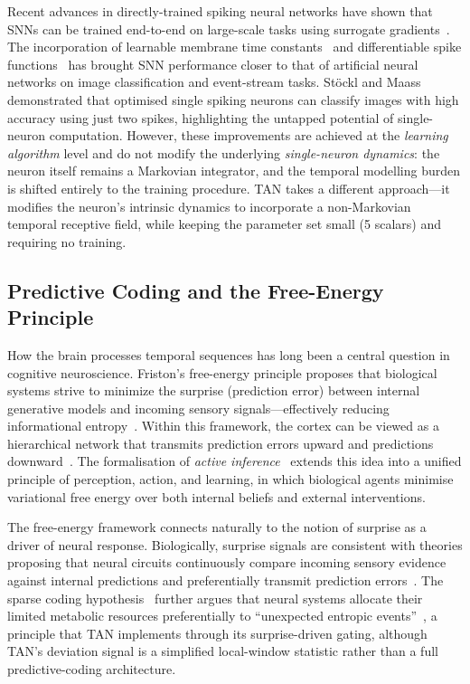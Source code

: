 Recent advances in directly-trained spiking neural networks have shown that SNNs can be trained end-to-end on large-scale tasks using surrogate gradients~\cite{eshraghian2021,neftci2019,fang2021}. The incorporation of learnable membrane time constants~\cite{fang2021} and differentiable spike functions~\cite{li2021differentiable} has brought SNN performance closer to that of artificial neural networks on image classification and event-stream tasks. St\"ockl and Maass~\cite{stockl2021} demonstrated that optimised single spiking neurons can classify images with high accuracy using just two spikes, highlighting the untapped potential of single-neuron computation. However, these improvements are achieved at the \textit{learning algorithm} level and do not modify the underlying \textit{single-neuron dynamics}: the neuron itself remains a Markovian integrator, and the temporal modelling burden is shifted entirely to the training procedure. TAN takes a different approach---it modifies the neuron's intrinsic dynamics to incorporate a non-Markovian temporal receptive field, while keeping the parameter set small (5 scalars) and requiring no training.

\subsection{Predictive Coding and the Free-Energy Principle}

How the brain processes temporal sequences has long been a central question in cognitive neuroscience. Friston's free-energy principle proposes that biological systems strive to minimize the surprise (prediction error) between internal generative models and incoming sensory signals---effectively reducing informational entropy~\cite{friston2010}. Within this framework, the cortex can be viewed as a hierarchical network that transmits prediction errors upward and predictions downward~\cite{keller2018,rao1999}. The formalisation of \textit{active inference}~\cite{friston2017} extends this idea into a unified principle of perception, action, and learning, in which biological agents minimise variational free energy over both internal beliefs and external interventions.

The free-energy framework connects naturally to the notion of surprise as a driver of neural response. Biologically, surprise signals are consistent with theories proposing that neural circuits continuously compare incoming sensory evidence against internal predictions and preferentially transmit prediction errors~\cite{srinivasan1982,friston2010}. The sparse coding hypothesis~\cite{olshausen1996} further argues that neural systems allocate their limited metabolic resources preferentially to ``unexpected entropic events''~\cite{attwell2001}, a principle that TAN implements through its surprise-driven gating, although TAN's deviation signal is a simplified local-window statistic rather than a full predictive-coding architecture.

